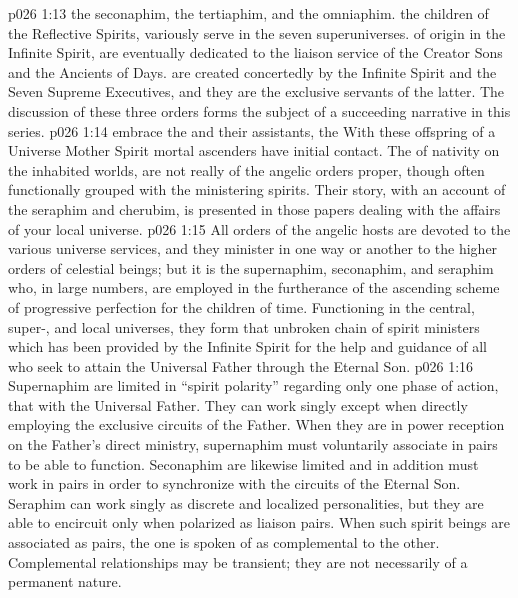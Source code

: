 \pc \vs p026 1:13 \bibnobreakspace {}the seconaphim, the tertiaphim, and the omniaphim.  the children of the Reflective Spirits, variously serve in the seven superuniverses.  of origin in the Infinite Spirit, are eventually dedicated to the liaison service of the Creator Sons and the Ancients of Days.  are created concertedly by the Infinite Spirit and the Seven Supreme Executives, and they are the exclusive servants of the latter. The discussion of these three orders forms the subject of a succeeding narrative in this series.
\pc \vs p026 1:14 \bibnobreakspace {} embrace the  and their assistants, the  With these offspring of a Universe Mother Spirit mortal ascenders have initial contact. The  of nativity on the inhabited worlds, are not really of the angelic orders proper, though often functionally grouped with the ministering spirits. Their story, with an account of the seraphim and cherubim, is presented in those papers dealing with the affairs of your local universe.
\pc \vs p026 1:15 All orders of the angelic hosts are devoted to the various universe services, and they minister in one way or another to the higher orders of celestial beings; but it is the supernaphim, seconaphim, and seraphim who, in large numbers, are employed in the furtherance of the ascending scheme of progressive perfection for the children of time. Functioning in the central, super-, and local universes, they form that unbroken chain of spirit ministers which has been provided by the Infinite Spirit for the help and guidance of all who seek to attain the Universal Father through the Eternal Son.
\vs p026 1:16 Supernaphim are limited in “spirit polarity” regarding only one phase of action, that with the Universal Father. They can work singly except when directly employing the exclusive circuits of the Father. When they are in power reception on the Father’s direct ministry, supernaphim must voluntarily associate in pairs to be able to function. Seconaphim are likewise limited and in addition must work in pairs in order to synchronize with the circuits of the Eternal Son. Seraphim can work singly as discrete and localized personalities, but they are able to encircuit only when polarized as liaison pairs. When such spirit beings are associated as pairs, the one is spoken of as complemental to the other. Complemental relationships may be transient; they are not necessarily of a permanent nature.\plusone
